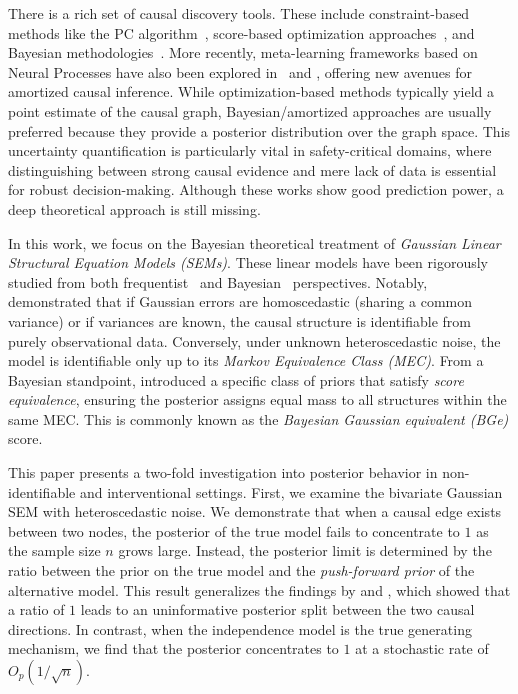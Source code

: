 \documentclass[accepted]{uai2026} %
\theoremstyle{boldremark}
\begin{document}
There is a rich set of causal discovery tools. These include constraint-based methods like the PC algorithm~\citet{PCalgorithm}, score-based optimization approaches~\citet{Peters_2013,lasso,NOTEARS}, and Bayesian methodologies~\citet{bayesdag,BCDNets,beingBayesian,annadani2021variational,GFlowbayesian,dynamicbayesian,cao:19}. More recently, meta-learning frameworks based on Neural Processes have also been explored in ~\citet{dhir2025metalearningapproachbayesiancausal}and \citet{dhir2026estimatinginterventionaldistributionsuncertain}, offering new avenues for amortized causal inference. While optimization-based methods typically yield a point estimate of the causal graph, Bayesian/amortized approaches are usually preferred because they provide a posterior distribution over the graph space. This uncertainty quantification is particularly vital in safety-critical domains, where distinguishing between strong causal evidence and mere lack of data is essential for robust decision-making. Although these works show good prediction power, a deep theoretical approach is still missing. 

In this work, we focus on the Bayesian theoretical treatment of \textit{Gaussian Linear Structural Equation Models (SEMs)}. These linear models have been rigorously studied from both  frequentist~\citet{peters2014identifiability,pearl2009causality} and Bayesian~\citet{heckerman2006a} perspectives. Notably, \citet{peters2014identifiability} demonstrated that if Gaussian errors are homoscedastic (sharing a common variance) or if variances are known, the causal structure is identifiable from purely observational data. Conversely, under unknown heteroscedastic noise, the model is identifiable only up to its \textit{Markov Equivalence Class (MEC)}. From a Bayesian standpoint, \citet{heckerman2006a} introduced a specific class of priors that satisfy \textit{score equivalence}, ensuring the posterior assigns equal mass to all structures within the same MEC. This is commonly known as the \textit{Bayesian Gaussian equivalent (BGe)} score. %

This paper presents a two-fold investigation into posterior behavior in non-identifiable and interventional settings. First, we examine the bivariate Gaussian SEM with heteroscedastic noise. We demonstrate that when a causal edge exists between two nodes, the posterior of the true model fails to concentrate to $1$ as the sample size $n$ grows large. Instead, the posterior limit is determined by the ratio between the prior on the true model and the \textit{push-forward prior} of the alternative model. This result generalizes the findings by \citet{dhir2024bivariatecausaldiscoveryusing} and \citet{geiger_annals}, which showed that a ratio of $1$ leads to an uninformative posterior split between the two causal directions. In contrast, when the independence model is the true generating mechanism, we find that the posterior concentrates to $1$ at a stochastic rate of $O_p(1/\sqrt{n})$. 
\end{document}
